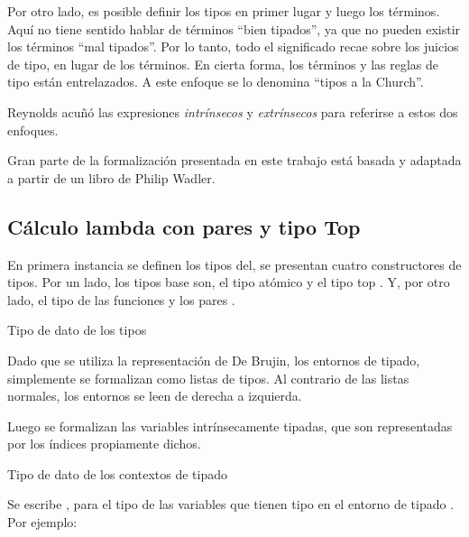 \documentclass[]{report}
\begin{document}
	Por otro lado, es posible definir los tipos en primer lugar y luego los términos.
	Aquí no tiene sentido hablar de términos ``bien tipados'', ya que no pueden existir los términos ``mal tipados''.
	Por lo tanto, todo el significado recae sobre los juicios de tipo, en lugar de los términos.
	En cierta forma, los términos y las reglas de tipo están entrelazados.
	A este enfoque se lo denomina ``tipos a la Church''.
	
	Reynolds\cite{reynolds_1998} acuñó las expresiones \textit{intrínsecos} y \textit{extrínsecos} para referirse a estos dos enfoques.
	
	Gran parte de la formalización presentada en este trabajo está basada y adaptada a partir de un libro de Philip Wadler\cite{plfa}.
	
	\subsection{Cálculo lambda con pares y tipo Top}
	
	En primera instancia se definen los tipos del, se presentan cuatro constructores de tipos.
	Por un lado, los tipos base son, el tipo atómico \AgdaInductiveConstructor{$\tau$} y el tipo top \AgdaInductiveConstructor{$\top$}.
	Y, por otro lado, el tipo de las funciones \AgdaInductiveConstructor{$\_\Rightarrow\_$} y los pares \AgdaInductiveConstructor{$\_\times\_$}.

	\begin{codigo}
		Tipo de dato de los tipos
		
	\end{codigo}
	
	Dado que se utiliza la representación de De Brujin, los entornos de tipado, simplemente se formalizan como listas de tipos.
	Al contrario de las listas normales, los entornos se leen de derecha a izquierda.
	
	Luego se formalizan las variables intrínsecamente tipadas, que son representadas por los índices propiamente dichos.
	
	\begin{codigo}
		Tipo de dato de los contextos de tipado
	\end{codigo}
	
	Se escribe \AgdaBound{$\Gamma$} \AgdaInductiveConstructor{$\ni$} , para el tipo de las variables que tienen tipo  en el entorno de tipado \AgdaBound{$\Gamma$}.
	Por ejemplo: 
	
\end{document}
